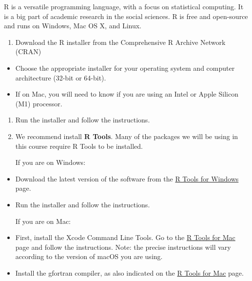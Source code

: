 \documentclass[
  letterpaper,
  DIV=11,
  numbers=noendperiod]{scrartcl}
\providecommand{\tightlist}{%
  \setlength{\itemsep}{0pt}\setlength{\parskip}{0pt}}\usepackage{longtable,booktabs,array}
\begin{document}
\begin{tcolorbox}[enhanced jigsaw, titlerule=0mm, breakable, arc=.35mm, opacitybacktitle=0.6, toprule=.15mm, opacityback=0, leftrule=.75mm, left=2mm, coltitle=black, colback=white, title=\textcolor{quarto-callout-tip-color}{\faLightbulb}\hspace{0.5em}{R install details}, colbacktitle=quarto-callout-tip-color!10!white, rightrule=.15mm, colframe=quarto-callout-tip-color-frame, bottomtitle=1mm, toptitle=1mm, bottomrule=.15mm]

R is a versatile programming language, with a focus on statistical
computing. It is a big part of academic research in the social sciences.
R is free and open-source and runs on Windows, Mac OS X, and Linux.

\begin{enumerate}
\def\labelenumi{\arabic{enumi}.}
\tightlist
\item
  Download the R installer from the Comprehensive R Archive Network
  (CRAN)
\end{enumerate}

\begin{itemize}
\tightlist
\item
  Choose the appropriate installer for your operating system and
  computer architecture (32-bit or 64-bit).
\item
  If on Mac, you will need to know if you are using an Intel or Apple
  Silicon (M1) processor.
\end{itemize}

\begin{enumerate}
\def\labelenumi{\arabic{enumi}.}
\setcounter{enumi}{1}
\item
  Run the installer and follow the instructions.
\item
  We recommend install \textbf{R Tools}. Many of the packages we will be
  using in this course require R Tools to be installed.

  If you are on Windows:
\end{enumerate}

\begin{itemize}
\item
  Download the latest version of the software from the
  \href{https://cran.r-project.org/bin/windows/Rtools/}{R Tools for
  Windows} page.
\item
  Run the installer and follow the instructions.

  If you are on Mac:
\item
  First, install the Xcode Command Line Tools. Go to the
  \href{https://mac.r-project.org/tools/}{R Tools for Mac} page and
  follow the instructions. Note: the precise instructions will vary
  according to the version of macOS you are using.
\item
  Install the gfortran compiler, as also indicated on the
  \href{https://mac.r-project.org/tools/}{R Tools for Mac} page.
\end{itemize}

\end{tcolorbox}
\end{document}
